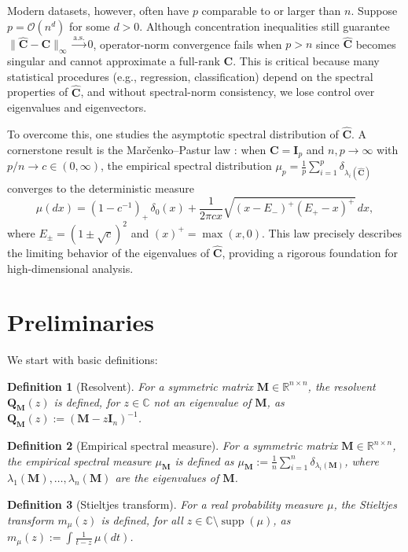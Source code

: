\documentclass[12pt]{article}
\newtheorem{definition}{Definition}
\begin{document}
Modern datasets, however, often have $p$ comparable to or larger than $n$. Suppose $p = \mathcal{O}(n^d)$ for some $d > 0$. Although concentration inequalities still guarantee $\|\hat{\mathbf{C}} - \mathbf{C}\|_{\infty} \xrightarrow{\mathrm{a.s.}} 0$, operator-norm convergence fails when $p > n$ since $\hat{\mathbf{C}}$ becomes singular and cannot approximate a full-rank $\mathbf{C}$. This is critical because many statistical procedures (e.g., regression, classification) depend on the spectral properties of $\hat{\mathbf{C}}$, and without spectral-norm consistency, we lose control over eigenvalues and eigenvectors.

To overcome this, one studies the asymptotic spectral distribution of $\hat{\mathbf{C}}$. A cornerstone result is the Mar\v{c}enko--Pastur law \citep{Marcenko1967}: when $\mathbf{C} = \mathbf{I}_p$ and $n, p \to \infty$ with $p/n \to c \in (0, \infty)$, the empirical spectral distribution $\mu_p = \frac{1}{p} \sum_{i=1}^p \delta_{\lambda_i(\hat{\mathbf{C}})}$ converges to the deterministic measure  
$$
\mu(dx) = (1 - c^{-1})_+\,\delta_0(x) + \frac{1}{2\pi c x} \sqrt{(x - E_-)^+ (E_+ - x)^+}\,dx,
$$
where $E_{\pm} = (1 \pm \sqrt{c})^2$ and $(x)^+ = \max(x, 0)$. This law precisely describes the limiting behavior of the eigenvalues of $\hat{\mathbf{C}}$, providing a rigorous foundation for high-dimensional analysis.

\section{Preliminaries}
We start with basic definitions:

\begin{definition}[Resolvent]
For a symmetric matrix $\mathbf{M} \in \mathbb{R}^{n \times n}$, the resolvent $\mathbf{Q}_\mathbf{M}(z)$ is defined, for $z \in \mathbb{C}$ not an eigenvalue of $\mathbf{M}$, as $\mathbf{Q}_\mathbf{M}(z) := (\mathbf{M} - z\mathbf{I}_n)^{-1}$.
\end{definition}

\begin{definition}[Empirical spectral measure]
For a symmetric matrix $\mathbf{M} \in \mathbb{R}^{n \times n}$, the empirical spectral measure $\mu_\mathbf{M}$ is defined as $\mu_\mathbf{M} := \frac{1}{n} \sum_{i=1}^{n} \delta_{\lambda_i(\mathbf{M})}$, where $\lambda_1(\mathbf{M}), \ldots, \lambda_n(\mathbf{M})$ are the eigenvalues of $\mathbf{M}$.
\end{definition}

\begin{definition}[Stieltjes transform]
For a real probability measure $\mu$, the Stieltjes transform $m_\mu(z)$ is defined, for all $z \in \mathbb{C} \setminus \operatorname{supp}(\mu)$, as $m_\mu(z) := \int \frac{1}{t - z} \, \mu(dt)$.
\end{definition}
\end{document}
